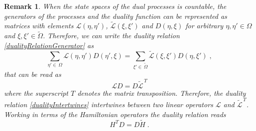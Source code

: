 \documentclass[10pt]{article}
\numberwithin{equation}{section}
\numberwithin{equation}{subsection}
\newtheorem{remark}{Remark}
\newcommand{\co}{\;,}
\newcommand{\dt}{\;.}
\begin{document}
\begin{remark}
When the state spaces of the dual processes is countable, the generators of the processes and the duality function can be represented as matrices with elements $\mathcal{L}(\eta,\eta')$, $\widetilde{\mathcal{L}}(\xi,\xi')$ and $D(\eta,\xi)$ for arbitrary $\eta,\eta'\in\Omega$ and $\xi,\xi'\in \widetilde{\Omega}$. Therefore, we can write the duality relation \eqref{dualityRelationGenerator} as 
\begin{equation}
    \sum_{\eta'\in\,\Omega}\mathcal{L}(\eta,\eta')D(\eta',\xi)=\sum_{\xi'\in\, \widetilde{\Omega}}\widetilde{\mathcal{L}}(\xi,\xi')D(\eta,\xi')\co
\end{equation}
that can be read as
\begin{equation}\label{dualityIntertwines}
    \mathcal{L}D=D\widetilde{\mathcal{L}}^{\,T}
\end{equation}
where the superscript $T$ denotes the matrix transposition. Therefore, the duality relation \eqref{dualityIntertwines}  intertwines between two linear operators $\mathcal{L}$ and $\widetilde{\mathcal{L}}^{\,T}$. Working in terms of the Hamiltonian operators the duality relation reads 
\begin{equation}\label{DualityRelation}
    H^{T}D=D\widetilde{H}\dt
\end{equation}
\end{remark}
\end{document}
